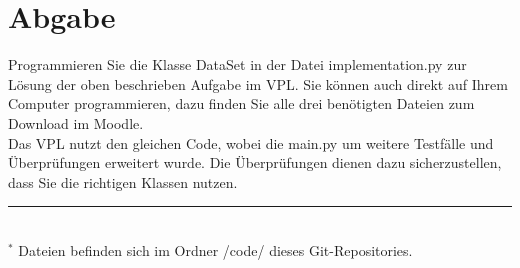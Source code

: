 \documentclass{article}
\begin{document}
\section{Abgabe}
Programmieren Sie die Klasse \dq DataSet\dq{} in der Datei \dq implementation.py\dq{} zur Lösung der oben beschrieben Aufgabe im VPL.
Sie können auch direkt auf Ihrem Computer programmieren, dazu finden Sie alle drei benötigten Dateien zum Download im Moodle.\\
Das VPL nutzt den gleichen Code, wobei die \dq main.py\dq{} um weitere Testfälle und Überprüfungen erweitert wurde.
Die Überprüfungen dienen dazu sicherzustellen, dass Sie die richtigen Klassen nutzen.\\
%
\hrule\hfill
\\[0.2cm]
$^*$ Dateien befinden sich im Ordner \dq /code/\dq{} dieses Git-Repositories.
\end{document}
